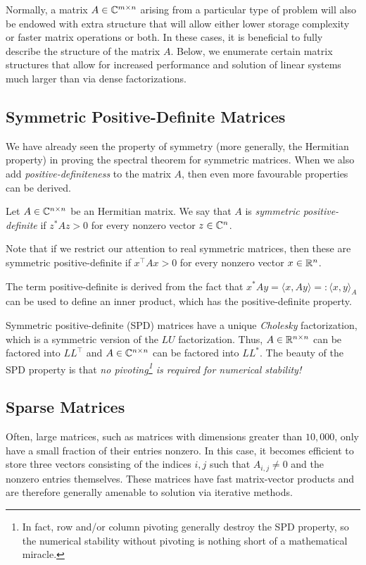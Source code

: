 Normally, a matrix $A\in\mathbb{C}^{m\times n}$ arising from a particular type of problem will also be endowed with extra structure that will allow either lower storage complexity or faster matrix operations or both. In these cases, it is beneficial to fully describe the structure of the matrix $A$. Below, we enumerate certain matrix structures that allow for increased performance and solution of linear systems much larger than via dense factorizations.

\subsection{Symmetric Positive-Definite Matrices}

We have already seen the property of symmetry (more generally, the Hermitian property) in proving the spectral theorem for symmetric matrices. When we also add {\em positive-definiteness} to the matrix $A$, then even more favourable properties can be derived.

\begin{definition}
Let $A\in\mathbb{C}^{n\times n}$ be an Hermitian matrix. We say that $A$ is {\em symmetric positive-definite} if $z^*Az > 0$ for every nonzero vector $z\in\mathbb{C}^n$.
\end{definition}
Note that if we restrict our attention to real symmetric matrices, then these are symmetric positive-definite if $x^\top A x>0$ for every nonzero vector $x\in\mathbb{R}^n$.

The term positive-definite is derived from the fact that $x^*Ay = \langle x,Ay\rangle =: \langle x,y\rangle_A$ can be used to define an inner product, which has the positive-definite property.

Symmetric positive-definite (SPD) matrices have a unique {\em Cholesky} factorization, which is a symmetric version of the $LU$ factorization. Thus, $A\in\mathbb{R}^{n\times n}$ can be factored into $LL^\top$ and $A\in\mathbb{C}^{n\times n}$ can be factored into $LL^*$. The beauty of the SPD property is that {\em no pivoting\footnote{In fact, row and/or column pivoting generally destroy the SPD property, so the numerical stability without pivoting is nothing short of a mathematical miracle.} is required for numerical stability!}

\subsection{Sparse Matrices}

Often, large matrices, such as matrices with dimensions greater than $10,000$, only have a small fraction of their entries nonzero. In this case, it becomes efficient to store three vectors consisting of the indices $i,j$ such that $A_{i,j}\ne0$ and the nonzero entries themselves. These matrices have fast matrix-vector products and are therefore generally amenable to solution via iterative methods.

